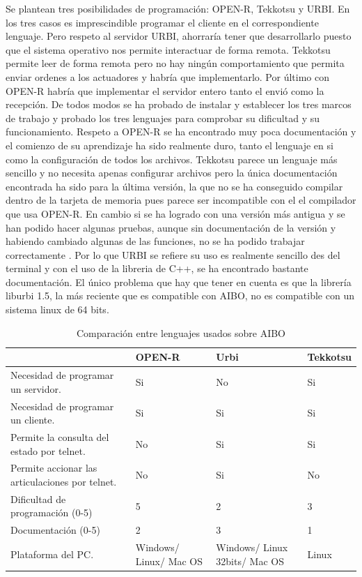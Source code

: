 \documentclass[12pt,a4paper,final,twoside]{book}
\begin{document}
Se plantean tres posibilidades de programación: OPEN-R, Tekkotsu y URBI.
En los tres casos es imprescindible programar el cliente en el correspondiente lenguaje. Pero respeto al servidor URBI, ahorraría tener que desarrollarlo puesto que el sistema operativo nos permite interactuar de forma remota. Tekkotsu permite leer de forma remota pero no hay ningún comportamiento que permita enviar ordenes a los actuadores y habría que implementarlo. Por último con OPEN-R habría que implementar el servidor entero tanto el envió como la recepción. 
De todos modos se ha probado de instalar y establecer los tres marcos de trabajo y probado los tres lenguajes para comprobar su dificultad y su funcionamiento. Respeto a OPEN-R se ha encontrado muy poca documentación y el comienzo de su aprendizaje ha sido realmente duro, tanto el lenguaje en si como la configuración de todos los archivos. Tekkotsu parece un lenguaje más sencillo y no necesita apenas configurar archivos pero la única documentación encontrada ha sido para la última versión, la que no se ha conseguido compilar dentro de la tarjeta de memoria pues parece ser incompatible con el el compilador que usa OPEN-R. En cambio si se ha logrado con una versión más antigua y se han podido hacer algunas pruebas, aunque sin documentación de la versión y habiendo cambiado algunas de las funciones, no se ha podido trabajar correctamente . 
Por lo que URBI se refiere su uso es realmente sencillo des del terminal y con el uso de la libreria de C++, se ha encontrado bastante documentación. El único problema que hay que tener en cuenta es que la librería liburbi 1.5, la más reciente que es compatible con  AIBO, no es compatible con un sistema linux de 64 bits. 

\begin{table}[H]
\begin{center}
\begin{tabulary}{\textwidth}{|p{5cm}|p{2.5cm}|p{2.5cm}|p{2.5cm}|}
\hline

& \textbf{OPEN-R}
& \textbf{Urbi} 
& \textbf{Tekkotsu} \\\hline
Necesidad de programar un servidor.
& Si
& No
& Si \\ \hline
Necesidad de programar un cliente.
& Si
& Si
& Si\\ \hline
Permite la consulta del estado por telnet.
& No
& Si
& Si\\ \hline
Permite accionar las articulaciones por telnet.
& No
& Si
& No\\ \hline
Dificultad de programación (0-5)
& 5
& 2 
& 3\\ \hline
Documentación (0-5)
& 2
& 3
& 1\\ \hline
Plataforma del PC.
& Windows/ Linux/ Mac OS
& Windows/ Linux 32bits/ Mac OS
& Linux\\ \hline
\end{tabulary}
\end{center}
\caption{Comparación entre lenguajes usados sobre AIBO\label{complleng}}
\end{table}
\end{document}
